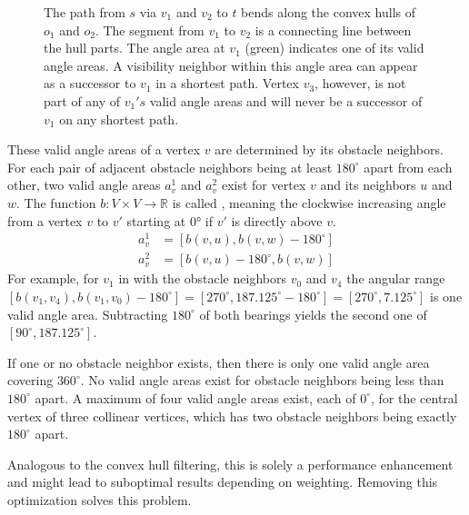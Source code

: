 \begin{figure}[h]
\begin{figcenter}
				\end{figcenter}
				\caption{
					The path from $s$ via $v_1$ and $v_2$ to $t$ bends along the convex hulls of $o_1$ and $o_2$.
					The segment from $v_1$ to $v_2$ is a connecting line between the hull parts.
					The angle area at $v_1$ (green) indicates one of its valid angle areas.
					A visibility neighbor within this angle area can appear as a successor to $v_1$ in a shortest path.
					Vertex $v_3$, however, is not part of any of $v_1's$ valid angle areas and will never be a successor of $v_1$ on any shortest path.
				}
				\label{fig:convex-hull}
			\end{figure}
			
			These valid angle areas of a vertex $v$ are determined by its obstacle neighbors.
			For each pair of adjacent obstacle neighbors being at least $180^\circ$ apart from each other, two valid angle areas $a_v^1$ and $a_v^2$ exist for vertex $v$ and its neighbors $u$ and $w$.
			The function $b: V \times V \rightarrow \mathbb{R}$ is called , meaning the clockwise increasing angle  from a vertex $v$ to $v'$ starting at 0° if $v'$ is directly above $v$.
			\begin{align*}
				a_v^1 &= [b(v, u), b(v, w) - 180^\circ] \\
				a_v^2 &= [b(v, u) - 180^\circ, b(v, w)]
			\end{align*}
			For example, for $v_1$ in  with the obstacle neighbors $v_0$ and $v_4$ the angular range $[b(v_1, v_4), b(v_1, v_0) - 180^\circ] = [270^\circ, 187.125^\circ - 180^\circ] = [270^\circ, 7.125^\circ]$ is one valid angle area.
			Subtracting $180^\circ$ of both bearings yields the second one of $[90^\circ, 187.125^\circ]$.
			
			If one or no obstacle neighbor exists, then there is only one valid angle area covering $360^\circ$.
			No valid angle areas exist for obstacle neighbors being less than $180^\circ$ apart.
			A maximum of four valid angle areas exist, each of $0^\circ$, for the central vertex of three collinear vertices, which has two obstacle neighbors being exactly $180^\circ$ apart.
			
			Analogous to the convex hull filtering, this is solely a performance enhancement and might lead to suboptimal results depending on weighting.
			Removing this optimization solves this problem.
			
